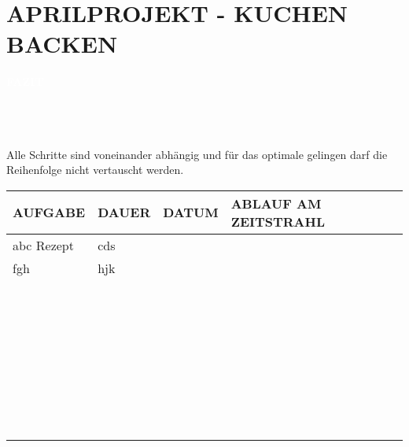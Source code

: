 \documentclass[a4paper, 12 pt]{article}
\newcommand{\coloredSectionDark}[1]{{\small \colorbox{DodgerBlue2}{\begin{minipage}{0.99\textwidth}{\textbf{#1 \vphantom{p\^{E}}}}\end{minipage}}}}
\begin{document}
\section*{\textcolor{DodgerBlue2}{APRILPROJEKT - KUCHEN BACKEN}}

\noindent
\coloredSectionDark{\textbf{\textcolor{white}{FAZIT}}}\\[-0.3cm]
\\\\
Alle Schritte sind voneinander abhängig und für das optimale gelingen darf die Reihenfolge nicht vertauscht werden.

\begin{table}[!ht]
    \begin{tabular*}{\columnwidth}{l|l|l|l}
        \hline
        \textbf{AUFGABE}       & \textbf{DAUER}    &  \textbf{DATUM}  &  \textbf{ABLAUF AM ZEITSTRAHL}\\ \hline 
        abc Rezept & cds  &  ~  &  ~          \\ \hline 
        fgh   & hjk  &  ~  &  ~          \\ \hline 
        ~                      & ~                 &  ~  &  ~          \\ \hline 
        ~                      & ~                 &  ~  &  ~          \\ \hline 
        ~                      & ~                 &  ~  &  ~          \\ \hline 
        ~                      & ~                 &  ~  &  ~          \\ \hline 
        ~                      & ~                 &  ~  &  ~          \\ \hline 
        ~                      & ~                 &  ~  &  ~          \\ \hline 
        ~                      & ~                 &  ~  &  ~          \\ \hline 
    \end{tabular*}
\end{table}
\end{document}
